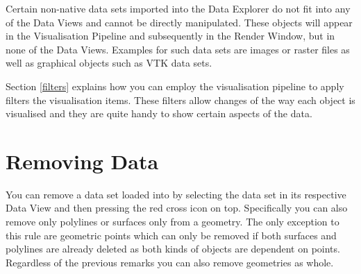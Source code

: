 Certain non-native data sets imported into the Data Explorer do not fit into any of the Data Views and cannot be directly manipulated. These objects will appear in the Visualisation Pipeline and subsequently in the Render Window, but in none of the Data Views. Examples for such data sets are images or raster files as well as graphical objects such as VTK data sets.

Section \ref{filters} explains how you can employ the visualisation pipeline to apply filters the visualisation items. These filters allow changes of the way each object is visualised and they are quite handy to show certain aspects of the data.

\section{Removing Data}

You can remove a data set loaded into \ogs by selecting the data set in its respective Data View and then pressing the red cross icon on top. Specifically you can also remove only polylines or surfaces only from a geometry. The only exception to this rule are geometric points which can only be removed if both surfaces and polylines are already deleted as both kinds of objects are dependent on points. Regardless of the previous remarks you can also remove geometries as whole. 